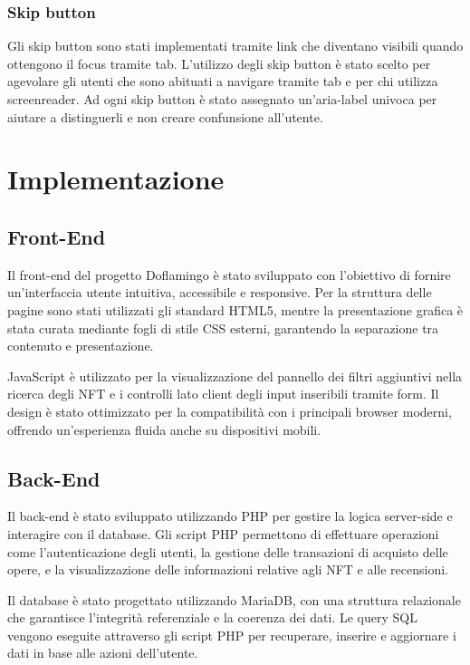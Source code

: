 \documentclass[10pt]{article}
\begin{document}
\subsubsection{Skip button}
Gli skip button sono stati implementati tramite link che diventano visibili quando ottengono il focus tramite tab. L'utilizzo degli skip button è stato scelto per agevolare gli utenti che sono abituati a navigare tramite tab e per chi utilizza screenreader. Ad ogni skip button è stato assegnato un'aria-label univoca per aiutare a distinguerli e non creare confunsione all'utente. 

\section{Implementazione}
\subsection{Front-End}
Il front-end del progetto Doflamingo è stato sviluppato con l'obiettivo di fornire un'interfaccia utente intuitiva, accessibile e responsive. Per la struttura delle pagine sono stati utilizzati gli standard HTML5, mentre la presentazione grafica è stata curata mediante fogli di stile CSS esterni, garantendo la separazione tra contenuto e presentazione.

JavaScript è utilizzato per la visualizzazione del pannello dei filtri aggiuntivi nella ricerca degli NFT e i controlli lato client degli input inseribili tramite form. Il design è stato ottimizzato per la compatibilità con i principali browser moderni, offrendo un'esperienza fluida anche su dispositivi mobili.

\subsection{Back-End}
Il back-end è stato sviluppato utilizzando PHP per gestire la logica server-side e interagire con il database. Gli script PHP permettono di effettuare operazioni come l'autenticazione degli utenti, la gestione delle transazioni di acquisto delle opere, e la visualizzazione delle informazioni relative agli NFT e alle recensioni.

Il database è stato progettato utilizzando MariaDB, con una struttura relazionale che garantisce l'integrità referenziale e la coerenza dei dati. Le query SQL vengono eseguite attraverso gli script PHP per recuperare, inserire e aggiornare i dati in base alle azioni dell'utente.
\end{document}
